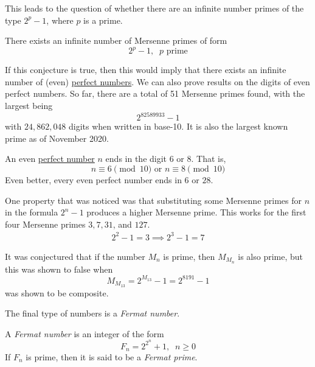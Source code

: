 \documentclass{article}
\newcounter{question}[section]
\newcounter{theorem}[section]
\newcounter{definition}[section]
\begin{document}
This leads to the question of whether there are an infinite number primes of the type $2^p - 1$, where $p$ is a prime. 

\begin{theorem}[Conjecture]
  \label{thm:conjecture}
There exists an infinite number of Mersenne primes of form
\begin{equation}
  2^p - 1, \;\; p \text{ prime}
\end{equation}
\end{theorem}

If this conjecture is true, then this would imply that there exists an infinite number of (even) \hyperref[def:perfect-number]{perfect numbers}. We can also prove results on the digits of even perfect numbers. So far, there are a total of 51 Mersenne primes found, with the largest being
\begin{equation}
  2^{82589933} -1
\end{equation}
with $24,862,048$ digits when written in base-10. It is also the largest known prime as of November 2020. 

\begin{theorem}
  \label{thm:last-digit-of-an-even-perfect-number}
An even \hyperref[def:perfect-number]{perfect number} $n$ ends in the digit $6$ or $8$. That is, 
\begin{equation}
  n \equiv 6 \pmod{10} \text{ or } n \equiv 8 \pmod{10}
\end{equation}
Even better, every even perfect number ends in $6$ or $28$. 
\end{theorem}

One property that was noticed was that substituting some Mersenne primes for $n$ in the formula $2^n - 1$ produces a higher Mersenne prime. This works for the first four Mersenne primes $3, 7, 31$, and $127$. 
\begin{align*}
    2^2 - 1 = 3 \implies 2^3 - 1 = 7 
\end{align*}

It was conjectured that if the number $M_n$ is prime, then $M_{M_n}$ is also prime, but this was shown to false when 
\begin{equation}
  M_{M_{13}} = 2^{M_{13}} - 1 = 2^{8191} - 1
\end{equation}
was shown to be composite. 

The final type of numbers is a \textit{Fermat number}. 

\begin{definition}
  \label{def:fermat-number}
A \textit{Fermat number} is an integer of the form
\begin{equation}
  F_n = 2^{2^n} + 1, \;\; n \geq 0
\end{equation}
If $F_n$ is prime, then it is said to be a \textit{Fermat prime}. 
\end{definition}
\end{document}
